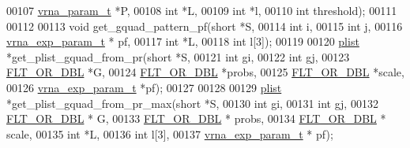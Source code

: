 \begin{DoxyCode}
00107                              \hyperlink{group__energy__parameters_structvrna__param__s}{vrna\_param\_t} *P,
00108                              \textcolor{keywordtype}{int}          *L,
00109                              \textcolor{keywordtype}{int}          *l,
00110                              \textcolor{keywordtype}{int}          threshold);
00111 
00112 
00113 \textcolor{keywordtype}{void} get\_gquad\_pattern\_pf(\textcolor{keywordtype}{short} *S,
00114                           \textcolor{keywordtype}{int} i,
00115                           \textcolor{keywordtype}{int} j,
00116                           \hyperlink{group__energy__parameters_structvrna__exp__param__s}{vrna\_exp\_param\_t} * pf,
00117                           \textcolor{keywordtype}{int} *L,
00118                           \textcolor{keywordtype}{int} l[3]);
00119 
00120 \hyperlink{group__struct__utils_structvrna__elem__prob__s}{plist} *get\_plist\_gquad\_from\_pr(\textcolor{keywordtype}{short}            *S,
00121                                \textcolor{keywordtype}{int}              gi,
00122                                \textcolor{keywordtype}{int}              gj,
00123                                \hyperlink{group__data__structures_ga31125aeace516926bf7f251f759b6126}{FLT\_OR\_DBL}       *G,
00124                                \hyperlink{group__data__structures_ga31125aeace516926bf7f251f759b6126}{FLT\_OR\_DBL}       *probs,
00125                                \hyperlink{group__data__structures_ga31125aeace516926bf7f251f759b6126}{FLT\_OR\_DBL}       *scale,
00126                                \hyperlink{group__energy__parameters_structvrna__exp__param__s}{vrna\_exp\_param\_t} *pf);
00127 
00128 
00129 \hyperlink{group__struct__utils_structvrna__elem__prob__s}{plist} *get\_plist\_gquad\_from\_pr\_max(\textcolor{keywordtype}{short} *S,
00130                                    \textcolor{keywordtype}{int} gi,
00131                                    \textcolor{keywordtype}{int} gj,
00132                                    \hyperlink{group__data__structures_ga31125aeace516926bf7f251f759b6126}{FLT\_OR\_DBL} * G,
00133                                    \hyperlink{group__data__structures_ga31125aeace516926bf7f251f759b6126}{FLT\_OR\_DBL} * probs,
00134                                    \hyperlink{group__data__structures_ga31125aeace516926bf7f251f759b6126}{FLT\_OR\_DBL} * scale,
00135                                    \textcolor{keywordtype}{int} *L,
00136                                    \textcolor{keywordtype}{int} l[3],
00137                                    \hyperlink{group__energy__parameters_structvrna__exp__param__s}{vrna\_exp\_param\_t} * pf);

\end{DoxyCode}
